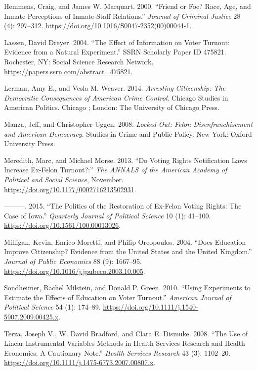 \documentclass[
  12pt,
]{article}
\newlength{\cslhangindent}
\newenvironment{cslreferences}%
  {\setlength{\parindent}{0pt}%
  \everypar{\setlength{\hangindent}{\cslhangindent}}\ignorespaces}%
  {\par}
\begin{document}
\begin{cslreferences}
\leavevmode\hypertarget{ref-Hemmens2000}{}%
Hemmens, Craig, and James W. Marquart. 2000. ``Friend or Foe? Race, Age, and Inmate Perceptions of Inmate-Staff Relations.'' \emph{Journal of Criminal Justice} 28 (4): 297--312. \url{https://doi.org/10.1016/S0047-2352(00)00044-1}.

\leavevmode\hypertarget{ref-Lassen2004}{}%
Lassen, David Dreyer. 2004. ``The Effect of Information on Voter Turnout: Evidence from a Natural Experiment.'' SSRN Scholarly Paper ID 475821. Rochester, NY: Social Science Research Network. \url{https://papers.ssrn.com/abstract=475821}.

\leavevmode\hypertarget{ref-Lerman2014}{}%
Lerman, Amy E., and Vesla M. Weaver. 2014. \emph{Arresting Citizenship: The Democratic Consequences of American Crime Control}. Chicago Studies in American Politics. Chicago ; London: The University of Chicago Press.

\leavevmode\hypertarget{ref-locked_out}{}%
Manza, Jeff, and Christopher Uggen. 2008. \emph{Locked Out: Felon Disenfranchisement and American Democracy}. Studies in Crime and Public Policy. New York: Oxford University Press.

\leavevmode\hypertarget{ref-Meredith2013}{}%
Meredith, Marc, and Michael Morse. 2013. ``Do Voting Rights Notification Laws Increase Ex-Felon Turnout?:'' \emph{The ANNALS of the American Academy of Political and Social Science}, November. \url{https://doi.org/10.1177/0002716213502931}.

\leavevmode\hypertarget{ref-Meredith2015}{}%
---------. 2015. ``The Politics of the Restoration of Ex-Felon Voting Rights: The Case of Iowa.'' \emph{Quarterly Journal of Political Science} 10 (1): 41--100. \url{https://doi.org/10.1561/100.00013026}.

\leavevmode\hypertarget{ref-Milligan2004}{}%
Milligan, Kevin, Enrico Moretti, and Philip Oreopoulos. 2004. ``Does Education Improve Citizenship? Evidence from the United States and the United Kingdom.'' \emph{Journal of Public Economics} 88 (9): 1667--95. \url{https://doi.org/10.1016/j.jpubeco.2003.10.005}.

\leavevmode\hypertarget{ref-Sondheimer2010}{}%
Sondheimer, Rachel Milstein, and Donald P. Green. 2010. ``Using Experiments to Estimate the Effects of Education on Voter Turnout.'' \emph{American Journal of Political Science} 54 (1): 174--89. \url{https://doi.org/10.1111/j.1540-5907.2009.00425.x}.

\leavevmode\hypertarget{ref-Terza2008}{}%
Terza, Joseph V., W. David Bradford, and Clara E. Dismuke. 2008. ``The Use of Linear Instrumental Variables Methods in Health Services Research and Health Economics: A Cautionary Note.'' \emph{Health Services Research} 43 (3): 1102--20. \url{https://doi.org/10.1111/j.1475-6773.2007.00807.x}.


\end{cslreferences}
\end{document}
